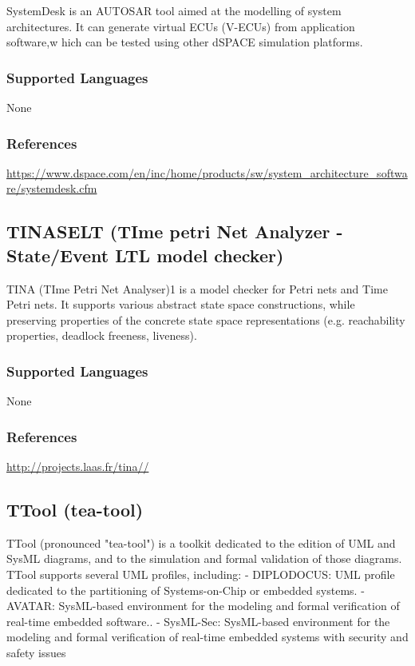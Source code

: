 SystemDesk is an AUTOSAR tool aimed at the modelling of system architectures.
It can generate virtual ECUs (V-ECUs) from application software,w hich can be tested using other dSPACE simulation platforms.

\subsubsection{Supported Languages}

None


\subsubsection{References}

\url{https://www.dspace.com/en/inc/home/products/sw/system_architecture_software/systemdesk.cfm}



\subsection{TINA\textunderscore SELT (TIme petri Net Analyzer - State/Event LTL model checker)}
\label{subsecT:TINA_SELT}

TINA (TIme Petri Net Analyser)1 is a model checker for Petri nets and Time Petri nets.
It supports various abstract state space constructions, while preserving properties of the concrete state space representations (e.g. reachability properties, deadlock freeness, liveness).

\subsubsection{Supported Languages}

None


\subsubsection{References}

\url{http://projects.laas.fr/tina//}



\subsection{TTool (tea-tool)}
\label{subsecT:TTool}


TTool (pronounced "tea-tool") is a toolkit dedicated to the edition of UML and SysML diagrams, and to the simulation and formal validation of those diagrams. TTool supports several UML profiles, including:
-    DIPLODOCUS: UML profile dedicated to the partitioning of Systems-on-Chip or embedded systems.
-    AVATAR: SysML-based environment for the modeling and formal verification of real-time embedded software..
-    SysML-Sec: SysML-based environment for the modeling and formal verification of real-time embedded systems with security and safety issues


